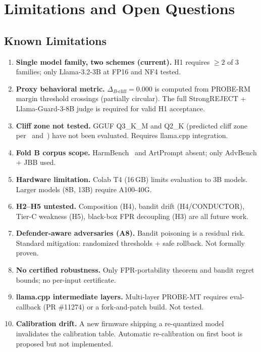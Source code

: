 \documentclass[11pt,a4paper]{article}
\newcommand{\bcliff}{\Delta_{B\text{-cliff}}}
\begin{document}
\section{Limitations and Open Questions}
\label{sec:limitations}

\subsection{Known Limitations}

\begin{enumerate}[leftmargin=2em, itemsep=4pt]
  \item \textbf{Single model family, two schemes (current).} H1 requires $\ge 2$ of 3
        families; only Llama-3.2-3B at FP16 and NF4 tested.
  \item \textbf{Proxy behavioral metric.} $\bcliff = 0.000$ is computed from
        PROBE-RM margin threshold crossings (partially circular). The full
        StrongREJECT + Llama-Guard-3-8B judge is required for valid H1 acceptance.
  \item \textbf{Cliff zone not tested.} GGUF Q3\_K\_M and Q2\_K (predicted cliff zone
        per~\citet{egashira2024exploiting} and~\citet{mindthegap2025}) have not been
        evaluated. Requires llama.cpp integration.
  \item \textbf{Fold B corpus scope.} HarmBench~\citep{mazeika2024harmbench} and
        ArtPrompt absent; only AdvBench + JBB used.
  \item \textbf{Hardware limitation.} Colab T4 (16\,GB) limits evaluation to 3B models.
        Larger models (8B, 13B) require A100-40G.
  \item \textbf{H2--H5 untested.} Composition (H4), bandit drift (H4/CONDUCTOR),
        Tier-C weakness (H5), black-box FPR decoupling (H3) are all future work.
  \item \textbf{Defender-aware adversaries (A8).} Bandit poisoning is a residual risk.
        Standard mitigation: randomized thresholds + safe rollback. Not formally proven.
  \item \textbf{No certified robustness.} Only FPR-portability theorem and bandit
        regret bounds; no per-input certificate.
  \item \textbf{llama.cpp intermediate layers.} Multi-layer PROBE-MT requires
        eval-callback (PR \#11274) or a fork-and-patch build. Not tested.
  \item \textbf{Calibration drift.} A new firmware shipping a re-quantized model
        invalidates the calibration table. Automatic re-calibration on first boot is
        proposed but not implemented.
\end{enumerate}
\end{document}
